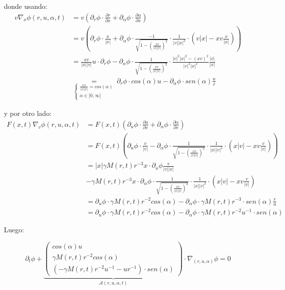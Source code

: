 \documentclass[a4paper,10pt]{scrartcl}
\theoremstyle{definition}
\numberwithin{equation}{section}
\begin{document}
donde usando:
\begin{align*}
 v \nabla_x \phi(r, u, \alpha, t) &= v \left(\partial_r \phi \cdot \frac{\partial r}{\partial x} + \partial_\alpha \phi \cdot \frac{\partial \alpha}{\partial x} \right)\\
 &= v\left(\partial_r \phi \cdot \frac{x}{|x|} + \partial_\alpha \phi \cdot \frac{-1}{\sqrt{1 - \left(\frac{xv}{|x||v|}\right)^2}} \cdot \frac{1}{|v||x|^2} \cdot\left(v|x| - xv \frac{x}{|x|}\right)\right)\\
 &= \frac{xv}{|x||v|} u \cdot\partial_r \phi - \partial_\alpha \phi \cdot \frac{1}{\sqrt{1 - \left(\frac{xv}{|x||v|}\right)^2}} \cdot \frac{|v|^2|x|^2 - (xv)^2}{|v|^2|x|^2} \frac{|v|}{|x|}\\
 &\underset{\left\{\begin{array}{c} \frac{xv}{|x||v|} = cos(\alpha)\\ \alpha \in ]0,\infty[\end{array}\right.}{=} \partial_r \phi \cdot cos(\alpha) u - \partial_\alpha \phi \cdot sen(\alpha) \frac{u}{r}
\end{align*}

y  por otro lado:
\begin{align*}
F(x,t) \nabla_v \phi(r, u, \alpha, t) &= F(x,t) \left(\partial_u \phi \cdot \frac{\partial u}{\partial v} + \partial_\alpha \phi \cdot \frac{\partial \alpha}{\partial v} \right) \\
&= F(x,t) \left(\partial_u \phi \cdot \frac{v}{|v|} - \partial_\alpha \phi \cdot \frac{1}{\sqrt{1 - \left(\frac{xv}{|x||v|}\right)^2}} \cdot \frac{1}{|x||v|^2} \cdot\left(x|v| - xv \frac{v}{|v|}\right)\right) \\
&= |x| \gamma M(r,t) r^{-3} x \cdot \partial_u \phi \frac{v}{|v||x|}\\
&- \gamma M(r,t) r^{-3} x \cdot \partial_\alpha \phi \cdot \frac{1}{\sqrt{1 - \left(\frac{xv}{|x||v|}\right)^2}} \cdot \frac{1}{|x||v|^2} \cdot\left(x|v| - xv \frac{v}{|v|}\right)\\
&= \partial_u \phi \cdot \gamma M(r,t) r^{-2} cos(\alpha) - \partial_\alpha \phi \cdot \gamma M(r,t) r^{-3} \cdot sen(\alpha) \frac{r}{u} \\
&= \partial_u \phi \cdot \gamma M(r,t) r^{-2} cos(\alpha) - \partial_\alpha \phi \cdot \gamma M(r,t) r^{-2} u^{-1} \cdot sen(\alpha)
\end{align*}

Luego:

\begin{equation}
\label{eqn:sph-vlasov}
\partial_t \phi + \underbrace{
    \left(\begin{array}{c}
        cos(\alpha)u\\
        \gamma M(r,t) r^{-2} cos(\alpha)\\
        (-\gamma M(r,t) r^{-2} u^{-1} - ur^{-1})\cdot sen(\alpha)
    \end{array}\right)}_{\mathcal{A}(r,u,\alpha,t)}
    \cdot \nabla_{(r,u,\alpha)} \phi = 0
\end{equation}
\end{document}
